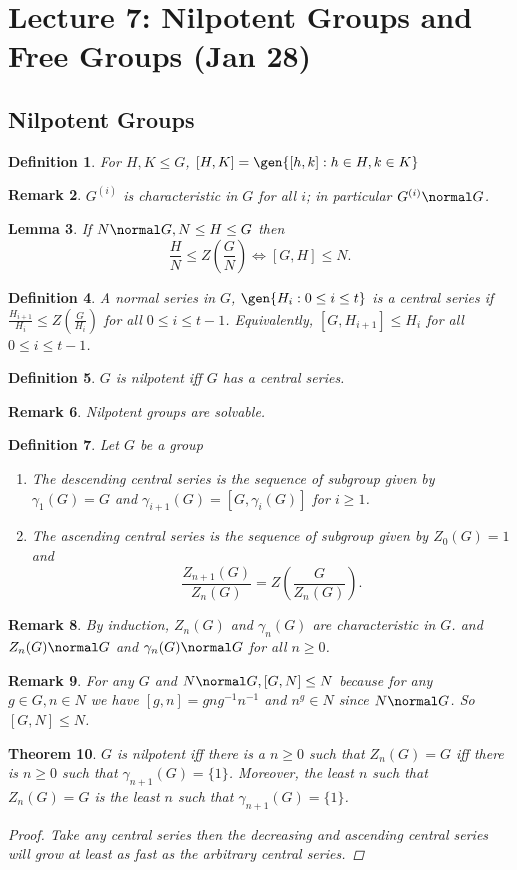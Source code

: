 \documentclass[a4paper,12pt]{article}
\newtheorem{thm}{Theorem}[section]
\newtheorem{lem}[thm]{Lemma}
\newtheorem{defn}[thm]{Definition}
\newtheorem{rmk}[thm]{Remark}
\begin{document}
\section{Lecture 7: Nilpotent Groups and Free Groups (Jan 28)}
\subsection{Nilpotent Groups}
\begin{defn}
    For $H,K\leq G$, $[H,K]=\gen{[h,k]: h\in H, k\in K}$
\end{defn}
\begin{rmk}
    $G^{(i)}$ is characteristic in $G$ for all $i$; in particular $G^{(i)}\normal G$. 
\end{rmk}  
\begin{lem}
    If $N\normal G, N\leq H \leq G$ then \[
    \frac{H}{N}\leq Z \left( \frac{G}{N} \right) \iff [G,H]\leq N
    .\]
\end{lem}
\begin{defn}
    A normal series in $G$, $\gen{H_i : 0\leq i \leq t}$ is a central series if $\frac{H_{i+1}}{H_i}\leq Z \left( \frac{G}{H_i} \right)$ for all $0\leq i \leq t-1$. Equivalently, $[G,H_{i+1}]\leq H_i$ for all $0\leq i \leq t-1$.
\end{defn}
\begin{defn}
    $G$ is nilpotent iff $G$ has a central series.
\end{defn}
\begin{rmk}
    Nilpotent groups are solvable.
\end{rmk}
\begin{defn}
    Let $G$ be a group
    \begin{enumerate}
        \item The descending central series is the sequence of subgroup given by $\gamma_1(G)=G$ and $\gamma_{i+1}(G)=[G,\gamma_i(G)]$ for $i\geq 1$.
        \item The ascending central series is the sequence of subgroup given by $Z_0(G)=1$ and \[
        \frac{Z_{n+1}(G)}{Z_n(G)}= Z \left( \frac{G}{Z_n(G)} \right)
        .\] 
    \end{enumerate}
\end{defn}
\begin{rmk}
    By induction, $Z_n(G)$ and $\gamma_n(G)$ are characteristic in $G$. and $Z_n(G)\normal G$ and $\gamma_n(G)\normal G$ for all $n\geq 0$.
\end{rmk}
\begin{rmk}
    For any $G$ and $N\normal G, [G,N]\leq N$ because for any $g\in G, n\in N$ we have $[g,n]=gng^{-1}n^{-1}$ and $n^g\in N$ since $N\normal G$. So $[G,N]\leq N$.
\end{rmk}
\begin{thm}
    $G$ is nilpotent iff there is a $n\geq 0$ such that $Z_n(G)=G$ iff there is $n\geq 0$ such that $\gamma_{n+1}(G)=\{1\}$. Moreover, the least $n$ such that $Z_n(G)=G$ is the least $n$ such that $\gamma_{n+1}(G)=\{1\}$.
    \begin{proof}
    Take any central series then the decreasing and ascending central series will grow at least as fast as the arbitrary central series. 
    \end{proof}
\end{thm}
\end{document}
